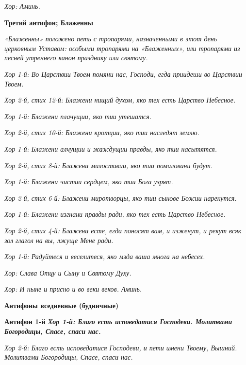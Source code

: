 \itshape Хор:\normalfont{} Аминь.





\bfseries Третий антифон; Блаженны\normalfont{}


\itshape «Блаженны» положено петь с тропарями, назначенными в этот день церковным Уставом: особыми тропарями на «Блаженных», или тропарями из песней утреннего канон празднику или святому.\normalfont{}


\itshape Хор 1-й:\normalfont{} Во Царствии Твоем помяни нас, Господи, егда приидеши во Царствии Твоем.


\itshape Хор 2-й, стих 12-й:\normalfont{} Блажени нищий духом, яко тех есть Царство Небесное.


\itshape Хор 1-й:\normalfont{} Блажени плачущии, яко тии утешатся.


\itshape Хор 2-й, стих 10-й:\normalfont{} Блажени кротции, яко тии наследят землю.


\itshape Хор 1-й:\normalfont{} Блажени алчущии и жаждущии правды, яко тии насытятся.


\itshape Хор 2-й, стих 8-й:\normalfont{} Блажени милостивии, яко тии помиловани будут.


\itshape Хор 1-й:\normalfont{} Блажени чистии сердцем, яко тии Бога узрят.


\itshape Хор 2-й, стих 6-й:\normalfont{} Блажени миротворцы, яко тии сынове Божии нарекутся.


\itshape Хор 1-й:\normalfont{} Блажени изгнани правды ради, яко тех есть Царство Небесное.


\itshape Хор 2-й, стих 4-й:\normalfont{} Блажени есте, егда поносят вам, и изженут, и рекут всяк зол глагол на вы, лжуще Мене ради.


\itshape Хор 1-й:\normalfont{} Радуйтеся и веселитеся, яко мзда ваша многа на небесех.


\itshape Хор:\normalfont{} Слава Отцу и Сыну и Святому Духу.


\itshape Хор:\normalfont{} И ныне и присно и во веки веков. Аминь.





\bfseries Антифоны вседневные (будничные)\normalfont{}


\bfseries Антифон 1-й\normalfont{} \itshape Хор 1-й:\normalfont{} Благо есть исповедатися Господеви. Молитвами Богородицы, Спасе, спаси нас.


\itshape Хор 2-й:\normalfont{} Благо есть исповедатися Господеви, и пети имени Твоему, Вышний. Молитвами Богородицы, Спасе, спаси нас.


